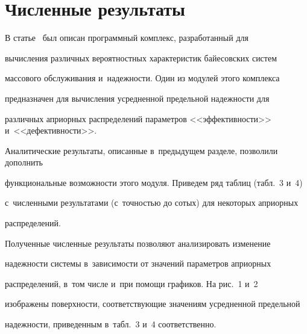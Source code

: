 \section{Численные результаты}





В статье~\cite{Ku15} был описан программный комплекс, разработанный для 


вы\-чис\-ле\-ния различных вероятностных характеристик байесовских систем 


массового обслуживания и~надежности. Один из модулей этого комплекса 


предназначен для вычисления усредненной предельной надежности для 


различных априорных распределений параметров <<эффективности>> и~<<дефективности>>. 


Аналитические результаты, описанные в~предыдущем разделе, позволили дополнить 


функциональные возможности этого модуля. Приведем ряд таблиц (табл.~3 и~4) 


с~численными результатами (с~точ\-ностью до сотых) для некоторых априорных 


распределений.




















Полученные численные результаты позволяют анализировать изменение 


надежности системы в~зависимости от значений параметров априорных 


распределений, в~том числе и~при помощи графиков. На рис.~1 и~2 


изображены поверхности, соответствующие значениям усредненной предельной 


надежности, приведенным в~табл.~3 и~4 соответственно.
















